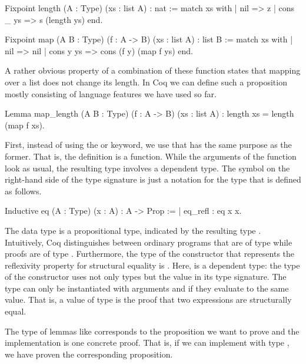 \begin{coqcode}
Fixpoint length (A : Type) (xs : list A) : nat :=
  match xs with
  | nil       => z
  | cons _ ys => s (length ys)
  end.

Fixpoint map (A B : Type) (f : A -> B) (xs : list A) : list B :=
  match xs with
  | nil => nil
  | cons y ys => cons (f y) (map f ys)
  end.
\end{coqcode}

A rather obvious property of a combination of these function states that mapping over a list does not change its length.
In Coq we can define such a proposition mostly consisting of language features we have used so far.

\begin{coqcode}
Lemma map_length (A B : Type) (f : A -> B) (xs : list A)
  : length xs = length (map f xs).
\end{coqcode}

First, instead of using the  or  keyword, we use  that has the same purpose as the former.
That is, the definition  is a function.
While the arguments of the function  look as usual, the resulting type involves a dependent type.
The symbol \cinl{=} on the right\--hand side of the type signature is just a notation for the type  that is defined as follows.

\begin{coqcode}
Inductive eq (A : Type) (x : A) : A -> Prop :=
| eq_refl : eq x x.
\end{coqcode}

The data type  is a propositional type, indicated by the resulting type .
Intuitively, Coq distinguishes between ordinary programs that are of type  while proofs are of type .
Furthermore, the type of the constructor  that represents the reflexivity property for structural equality is .
Here,  is a dependent type: the type of the constructor  uses not only types but the value  in its type signature.
The type  can only be instantiated with arguments  and  if they evaluate to the same value.
That is, a value of type  is the proof that two expressions are structurally equal.

The type of lemmas like  corresponds to the proposition we want to prove and the implementation is one concrete proof.
That is, if we can implement  with type , we have proven the corresponding proposition.

